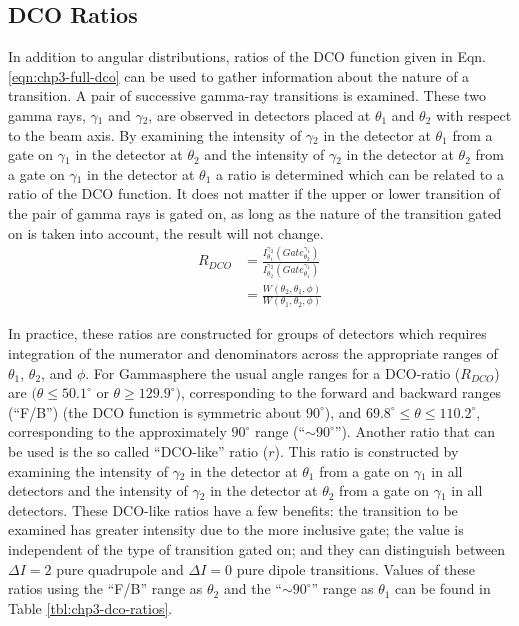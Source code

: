 \subsection{DCO Ratios}
\label{sssec:exp-pr-data-ang-cor-dco}
In addition to angular distributions, ratios of the DCO function given in Eqn. \ref{eqn:chp3-full-dco} can be used to gather information about the nature of a transition\cite{dcoRatios}. A pair of successive gamma-ray transitions is examined. These two gamma rays, $\gamma{}_1$ and $\gamma{}_2$, are observed in detectors placed at $\theta{}_1$ and $\theta{}_2$ with respect to the beam axis. By examining the intensity of $\gamma{}_2$ in the detector at $\theta_1$ from a gate on $\gamma{}_1$ in the detector at $\theta{}_2$ and the intensity of $\gamma{}_2$ in the detector at $\theta_2$ from a gate on $\gamma{}_1$ in the detector at $\theta{}_1$ a ratio is determined which can be related to a ratio of the DCO function. It does not matter if the upper or lower transition of the pair of gamma rays is gated on, as long as the nature of the transition gated on is taken into account, the result will not change.
\begin{align}
R_{DCO} &= \frac{I^{\gamma{}_2}_{\theta{}_1}(Gate^{\gamma{}_1}_{\theta{}_2})}{I^{\gamma{}_2}_{\theta{}_2}(Gate^{\gamma{}_1}_{\theta{}_1})} \label{eqn:chp3:exp-dco-ratio}\\
 &= \frac{W(\theta{}_2,\theta{}_1,\phi{})}{W(\theta{}_1,\theta{}_2,\phi{})} \label{eqn:chp3:theory-dco-ratio}
\end{align}

In practice, these ratios are constructed for groups of detectors which requires integration of the numerator and denominators across the appropriate ranges of $\theta{}_1$, $\theta{}_2$, and $\phi{}$. For Gammasphere the usual angle ranges for a DCO-ratio ($R_{DCO}$) are $(\theta{}\leq{}50.1^{\circ}$ or $\theta{}\geq{}129.9^{\circ})$, corresponding to the forward and backward ranges (``F/B'') (the DCO function is symmetric about $90^{\circ}$), and $69.8^{\circ}\leq{}\theta{}\leq{}110.2^{\circ}$, corresponding to the approximately $90^{\circ{}}$ range (``$\sim{}90^{\circ}$'').  Another ratio that can be used is the so called ``DCO-like'' ratio ($r$). This ratio is constructed by examining the intensity of $\gamma{}_2$ in the detector at $\theta_1$ from a gate on $\gamma{}_1$ in all detectors and the intensity of $\gamma{}_2$ in the detector at $\theta_2$ from a gate on $\gamma{}_1$ in all detectors. These DCO-like ratios have a few benefits: the transition to be examined has greater intensity due to the more inclusive gate; the value is independent of the type of transition gated on; and they can distinguish between $\Delta I=2$ pure quadrupole and $\Delta I=0$ pure dipole transitions. Values of these ratios using the ``F/B'' range as $\theta_2$ and the ``$\sim{}90^{\circ}$'' range as $\theta_1$ can be found in Table \ref{tbl:chp3-dco-ratios}.

